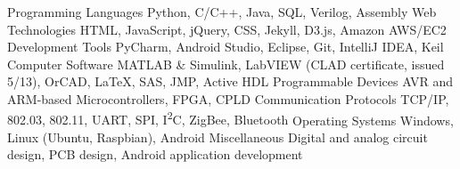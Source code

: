 \begin{cvskills}
  \cvskill
    {Programming Languages}
    {Python, C/C++, Java, SQL, Verilog, Assembly}
  \cvskill
    {Web Technologies}
    {HTML, JavaScript, jQuery, CSS, Jekyll, D3.js, Amazon AWS/EC2}
  \cvskill
    {Development Tools}
    {PyCharm, Android Studio, Eclipse, Git, IntelliJ IDEA, Keil}
  \cvskill
    {Computer Software}
    {MATLAB \& Simulink, LabVIEW (CLAD certificate, issued 5/13), OrCAD, \LaTeX, SAS, JMP, Active HDL}
  \cvskill
    {Programmable Devices}
    {AVR and ARM-based Microcontrollers, FPGA, CPLD}
  \cvskill
    {Communication Protocols}
    {TCP/IP, 802.03, 802.11, UART, SPI, I\textsuperscript{2}C, ZigBee, Bluetooth}
  \cvskill
    {Operating Systems}
    {Windows, Linux (Ubuntu, Raspbian), Android}
  \cvskill
    {Miscellaneous}
    {Digital and analog circuit design, PCB design, Android application development}
\end{cvskills} 